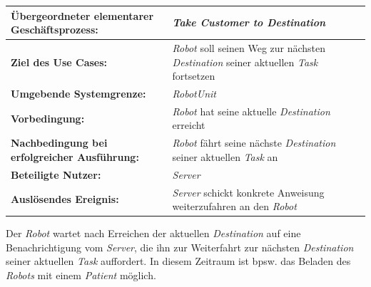 			\begin{table}[H]
				\centering
				\begin{tabularx}{\textwidth}{|p{5cm}|X|}
					\hline
					\textbf{Übergeordneter elementarer Geschäftsprozess:} & \emph{Take Customer to Destination}  \\ \hline
					\textbf{Ziel des Use Cases:} & \emph{Robot} soll seinen Weg zur nächsten \emph{Destination} seiner aktuellen \emph{Task} fortsetzen \\ \hline
					\textbf{Umgebende Systemgrenze:} & \emph{RobotUnit} \\ \hline
					\textbf{Vorbedingung:} & \emph{Robot} hat seine aktuelle \emph{Destination} erreicht \\ \hline
					\textbf{Nachbedingung bei erfolgreicher Ausführung:} & \emph{Robot} fährt seine nächste \emph{Destination} seiner aktuellen \emph{Task} an \\ \hline
					\textbf{Beteiligte Nutzer:} & \emph{Server} \\ \hline
					\textbf{Auslösendes Ereignis:} & \emph{Server} schickt konkrete Anweisung weiterzufahren an den \emph{Robot} \\
					\hline
				\end{tabularx}
			\end{table}

			Der \emph{Robot} wartet nach Erreichen der aktuellen \emph{Destination} auf eine Benachrichtigung vom \emph{Server}, die ihn zur Weiterfahrt zur nächsten \emph{Destination} seiner aktuellen \emph{Task} auffordert. In diesem Zeitraum ist bpsw. das Beladen des \emph{Robots} mit einem \emph{Patient} möglich.

